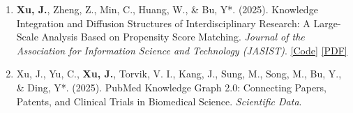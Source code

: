 \documentclass[a4paper,9pt]{extarticle}
\begin{document}
\vspace{0.2cm}
\begin{enumerate}[leftmargin=0.8cm]
    \item \textbf{Xu, J.}, Zheng, Z., Min, C., Huang, W., \& Bu, Y*. (2025). Knowledge Integration and Diffusion Structures of Interdisciplinary Research: A Large-Scale Analysis Based on Propensity Score Matching. \textit{Journal of the Association for Information Science and Technology (JASIST)}. \href{https://github.com/jiaweixu98/SciSci_IDR_vs_UDR}{[Code]} \href{https://asistdl.onlinelibrary.wiley.com/doi/full/10.1002/asi.25014}{[PDF]} 
    \vspace{.2cm}
    \item Xu, J., Yu, C., \textbf{Xu, J.}, Torvik, V. I., Kang, J., Sung, M., Song, M., Bu, Y., \& Ding, Y*. (2025). PubMed Knowledge Graph 2.0: Connecting Papers, Patents, and Clinical Trials in Biomedical Science. \textit{Scientific Data}.
    \vspace{.2cm}
\end{enumerate}
\end{document}
